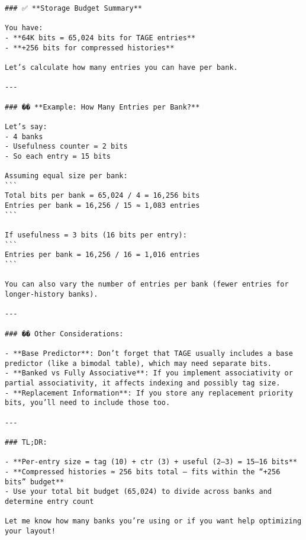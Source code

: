 \documentclass[11pt]{article}
\begin{document}
\begin{verbatim}
### ✅ **Storage Budget Summary**

You have:
- **64K bits = 65,024 bits for TAGE entries**
- **+256 bits for compressed histories**

Let’s calculate how many entries you can have per bank.

---

### �� **Example: How Many Entries per Bank?**

Let’s say:
- 4 banks
- Usefulness counter = 2 bits
- So each entry = 15 bits

Assuming equal size per bank:
```
Total bits per bank = 65,024 / 4 = 16,256 bits
Entries per bank = 16,256 / 15 ≈ 1,083 entries
```

If usefulness = 3 bits (16 bits per entry):
```
Entries per bank = 16,256 / 16 = 1,016 entries
```

You can also vary the number of entries per bank (fewer entries for longer-history banks).

---

### ��️ Other Considerations:

- **Base Predictor**: Don’t forget that TAGE usually includes a base predictor (like a bimodal table), which may need separate bits.
- **Banked vs Fully Associative**: If you implement associativity or partial associativity, it affects indexing and possibly tag size.
- **Replacement Information**: If you store any replacement priority bits, you’ll need to include those too.

---

### TL;DR:

- **Per-entry size = tag (10) + ctr (3) + useful (2–3) = 15–16 bits**
- **Compressed histories ≈ 256 bits total — fits within the “+256 bits” budget**
- Use your total bit budget (65,024) to divide across banks and determine entry count

Let me know how many banks you’re using or if you want help optimizing your layout!
\end{verbatim}
\end{document}
